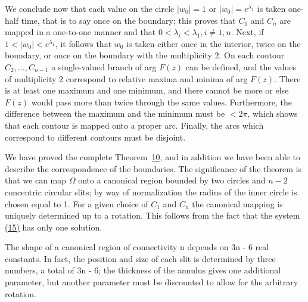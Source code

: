 We conclude now that each value on the circle $|w_{0}| = 1$ or $|w_{0}| = e^{\lambda_{1}}$ is taken one-half time, that is to say once on the boundary; this proves that $C_{1}$ and $C_{n}$ are mapped in a one-to-one manner and that $0 < \lambda_{i} < \lambda_{1}, i \neq 1, n$. Next, if $1 < |w_{0}| < e^{\lambda_{1}}$, it follows that $w_{0}$ is taken either once in the interior, twice on the boundary, or once on the boundary with the multiplicity 2. On each contour $C_{2}, \ldots, C_{n-1}$ a single-valued branch of arg $F(z)$ can be defined, and the values of multiplicity 2 correspond to relative maxima and minima of arg $F(z)$. There is at least one maximum and one minimum, and there cannot be more or else $F(z)$ would pass more than twice through the same values. Furthermore, the difference between the maximum and the minimum must be $<2\pi$, which shows that each contour is mapped onto a proper arc. Finally, the arcs which correspond to different contours must be disjoint.

\begingroup\renewcommand{\thefootnote}{}\endgroup

We have proved the complete Theorem~\hyperref[thm:6.10]{10}, and in addition we have been able to describe the correspondence of the boundaries. The significance of the theorem is that we can map $\Omega$ onto a canonical region bounded by two circles and $n - 2$ concentric circular slits; by way of normalization the radius of the inner circle is chosen equal to 1. For a given choice of $C_1$ and $C_n$ the canonical mapping is uniquely determined up to a rotation. This follows from the fact that the system \hyperref[eq:6.15]{(15)} has only one solution.

The shape of a canonical region of connectivity n depends on 3n - 6 real constants. In fact, the position and size of each slit is determined by three numbers, a total of 3n - 6; the thickness of the annulus gives one additional parameter, but another parameter must be discounted to allow for the arbitrary rotation.

